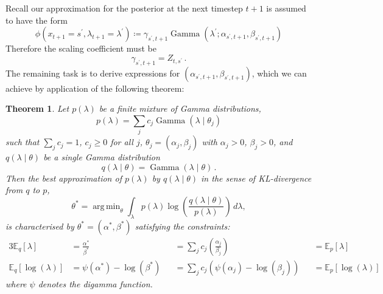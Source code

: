 \documentclass[twoside, 11pt]{article}
\DeclareMathOperator*{\argmin}{arg\,min}
\DeclareMathOperator*{\gammad}{Gamma}
\newcommand{\E}[0] {\mathbb{E}} %
\newtheorem{thm}{Theorem}
\begin{document}
Recall our approximation for the posterior at the next timestep $t+1$ is assumed to have the form
\begin{equation}
\phi(x_{t+1}=s^{\prime}, \lambda_{t+1}=\lambda^{\prime}) \coloneqq \gamma_{s^{\prime},t+1} \gammad(\lambda^{\prime} ; \alpha_{s^{\prime},t+1}, \beta_{s^{\prime},t+1})
\end{equation}
Therefore the scaling coefficient must be
\begin{equation}
\gamma_{s^{\prime},t+1} = Z_{t,s^{\prime}} \, .
\end{equation}
The remaining task is to derive expressions for $(\alpha_{s^{\prime},t+1}, \beta_{s^{\prime},t+1})$, which we can achieve by application of the following theorem:

\begin{thm}
Let $p(\lambda)$ be a finite mixture of Gamma distributions,
\begin{equation}
p(\lambda) = \sum_j c_j \gammad(\lambda \mid \theta_j)
\end{equation}
such that $\sum_j c_j = 1$, $c_j \geq 0$ for all $j$, $\theta_j = (\alpha_j, \beta_j)$ with $\alpha_j > 0$, $\beta_j > 0$, and $q(\lambda \mid \theta)$ be a single Gamma distribution
\begin{equation}
q(\lambda \mid \theta ) = \gammad(\lambda \mid \theta) \, .
\end{equation}
Then the best approximation of $p(\lambda)$ by $q(\lambda \mid \theta)$ in the sense of KL-divergence from $q$ to $p$,
\begin{equation}
\theta^{*} = \argmin_{\theta} \int_{\lambda} p(\lambda) \log \left( \frac{q(\lambda \mid \theta) }{ p(\lambda) } \right) \, d\lambda ,
\end{equation}
is characterised by $\theta^* = (\alpha^*, \beta^*)$ satisfying the constraints:
\begin{alignat}{3}
\E_q \left[ \lambda \right]
& = \frac{\alpha^*}{\beta^*}
&& = \sum_j c_j \left( \frac{\alpha_j}{\beta_j} \right)
&& = \E_p \left[ \lambda \right] \\
\E_q \left[ \log(\lambda) \right]
& = \psi(\alpha^*) - \log(\beta^*)
&& = \sum_j c_j \left( \psi(\alpha_j) - \log(\beta_j) \right)
&& = \E_p \left[ \log(\lambda) \right]
\end{alignat}
where $\psi$ denotes the digamma function.

\end{thm}
\end{document}
